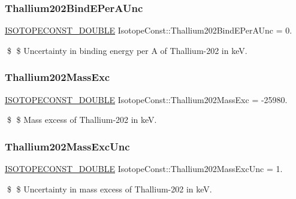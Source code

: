 \subsubsection{\texorpdfstring{Thallium202\+Bind\+E\+Per\+A\+Unc}{Thallium202BindEPerAUnc}}
{\footnotesize\ttfamily \mbox{\hyperlink{group___isotope_const-_macros_ga8f45a7272ce02c0b4c65c44636ed719a}{I\+S\+O\+T\+O\+P\+E\+C\+O\+N\+S\+T\+\_\+\+D\+O\+U\+B\+LE}} Isotope\+Const\+::\+Thallium202\+Bind\+E\+Per\+A\+Unc = 0.}

\$ \$ Uncertainty in binding energy per A of Thallium-\/202 in keV. \mbox{\label{group___isotope_const-_thallium-_tl202_ga21b3ec4d267db36c7884fa94969a034f}} 
\subsubsection{\texorpdfstring{Thallium202\+Mass\+Exc}{Thallium202MassExc}}
{\footnotesize\ttfamily \mbox{\hyperlink{group___isotope_const-_macros_ga8f45a7272ce02c0b4c65c44636ed719a}{I\+S\+O\+T\+O\+P\+E\+C\+O\+N\+S\+T\+\_\+\+D\+O\+U\+B\+LE}} Isotope\+Const\+::\+Thallium202\+Mass\+Exc = -\/25980.}

\$ \$ Mass excess of Thallium-\/202 in keV. \mbox{\label{group___isotope_const-_thallium-_tl202_ga4bb87ad98b2e95101c9deb95f1afde51}} 
\subsubsection{\texorpdfstring{Thallium202\+Mass\+Exc\+Unc}{Thallium202MassExcUnc}}
{\footnotesize\ttfamily \mbox{\hyperlink{group___isotope_const-_macros_ga8f45a7272ce02c0b4c65c44636ed719a}{I\+S\+O\+T\+O\+P\+E\+C\+O\+N\+S\+T\+\_\+\+D\+O\+U\+B\+LE}} Isotope\+Const\+::\+Thallium202\+Mass\+Exc\+Unc = 1.}

\$ \$ Uncertainty in mass excess of Thallium-\/202 in keV. \mbox{\label{group___isotope_const-_thallium-_tl202_ga81ba4c512f4be853233875e1d5cbdd17}} 
